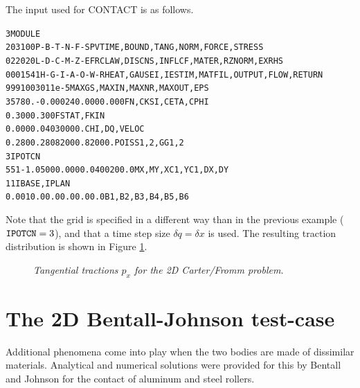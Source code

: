 \documentclass[12pt]{report}
\begin{document}
The input used for CONTACT is as follows.
\begin{alltt}\small
 3  MODULE
  203100     P-B-T-N-F-S        PVTIME, BOUND , TANG  , NORM , FORCE, STRESS
  022020     L-D-C-M-Z-E        FRCLAW, DISCNS, INFLCF, MATER, RZNORM, EXRHS
 0001541   H-G-I-A-O-W-R  HEAT, GAUSEI, IESTIM, MATFIL, OUTPUT, FLOW, RETURN
   999   100    30      1     1e-5     MAXGS , MAXIN , MAXNR , MAXOUT, EPS
  35780.   -0.00024  0.000    0.000            FN, CKSI, CETA, CPHI
   0.300    0.300                              FSTAT, FKIN
   0.000    0.040    30000.                    CHI, DQ, VELOC
   0.280    0.280    82000.   82000.           POISS 1,2,  GG 1,2
    3                                          IPOTCN
  55   1   -1.0500   0.000    0.0400   200.0   MX,MY,XC1,YC1,DX,DY
   1   1                                       IBASE, IPLAN
   0.001   0.0   0.0   0.0   0.0   0.0         B1,B2,B3,B4,B5,B6
\end{alltt}
Note that the grid is specified in a different way than in the previous
example (${\tt IPOTCN}=3$), and that a time step size $\delta q=\delta x$
is used. The resulting traction distribution is shown in Figure
\ref{fig:carter2d}.

\begin{figure}[bt]
\centering
{}
\caption{\em Tangential tractions $p_x$ for the 2D Carter/Fromm problem.}
\label{fig:carter2d}
\end{figure}

\section{The 2D Bentall-Johnson test-case}
\label{sec:ex_bentall}

Additional phenomena come into play when the two bodies are made of
dissimilar materials. Analytical and numerical solutions were provided for
this by Bentall and Johnson \cite{Bentall1967} for the contact of aluminum
and steel rollers.
\end{document}

